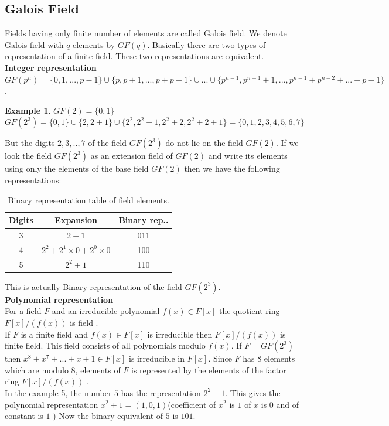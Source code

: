\documentclass[11pt]{amsart}
\theoremstyle{plain}
\theoremstyle{definition}
\newtheorem{example}[theorem]{Example}
\numberwithin{equation}{section}
\begin{document}
\subsection{Galois Field}
 Fields having only finite number of elements are called Galois field. We denote Galois field with \(q\) elements by \(GF(q)\). Basically there are two types of representation of a finite field. These two representations are equivalent.\\

\textbf{Integer representation}\\
\(GF(p^n)=\{0,1,...,p-1\} \cup \{p,p+1,...,p+p-1\} \cup ... \cup \{p^{n-1},p^{n-1}+1,...,p^{n-1}+p^{n-2}+...+p-1\}\) \cite{galois}.

\begin{example}
    \(GF(2)=\{0,1\}\)\\
    \(GF(2^3)=\{0,1\} \cup \{2,2+1\} \cup \{2^2,2^2+1,2^2+2,2^2+2+1\}=\{0,1,2,3,4,5,6,7\}\)
\end{example}

But the digits \(2,3,..,7\) of the field \(GF(2^3)\) do not lie on the field \(GF(2)\). If we look the field \(GF(2^3)\) as an extension field of \(GF(2)\) and write its elements using only the elements of the base field \(GF(2)\) then we have the following representations:

\begin{table}[h!]
  \centering
\begin{tabular}{|c|c|c|}
    \hline
    Digits & Expansion & Binary rep..\\
    \hline
    3 & \(2+1\) & 011 \\
    4 & \(2^2+2^1 \times 0 +2^0 \times 0\) & 100 \\
    5 & \(2^2+1\) & 110 \\
    \hline
\end{tabular}
\caption{\small Binary representation table of field elements.}
\end{table}

This is actually Binary representation of the field \(GF(2^3)\).\\

\textbf{Polynomial representation}\\
For a field \(F\) and an irreducible polynomial \(f(x) \in F[x]\) the quotient ring \(F[x]/(f(x))\) is field \cite{galois}.\\
If \(F\) is a finite field and \(f(x) \in F[x]\) is irreducible then \(F[x]/(f(x))\) is finite field. This field consists of all polynomials modulo \(f(x)\). If \(F=GF(2^3)\) then \(x^8+x^7+...+x+1 \in F[x]\) is irreducible in \(F[x]\). Since \(F\) has \(8\) elements which are modulo \(8\), elements of \(F\) is represented by the elements of the factor ring \(F[x]/(f(x))\) \cite{aes}. \\
In the example-5, the number \(5\) has the representation \(2^2+1\). This gives the polynomial representation \(x^2+1=(1,0,1)\)(coefficient of \(x^2\) is \(1\) of \(x\) is \(0\) and of constant is \(1\) ) Now the binary equivalent of \(5\) is \(101\).\\
\end{document}
